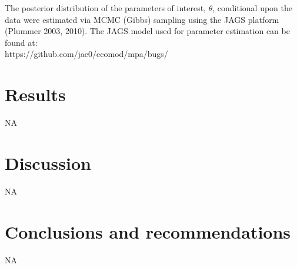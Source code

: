 \documentclass[letterpaper,portrait,11pt]{scrartcl}
\numberwithin{equation}{section}		%
\numberwithin{figure}{section}			%
\numberwithin{table}{section}				%
\begin{document}
The posterior distribution of the parameters of interest, $\theta$, conditional upon the data were estimated via MCMC (Gibbs) sampling using the JAGS platform (Plummer 2003, 2010). The JAGS model used for parameter estimation can be found at: \\

https://github.com/jae0/ecomod/mpa/bugs/




\section{Results}

NA

\section{Discussion}

NA

\section{Conclusions and recommendations}

NA




\clearpage

%
%



\clearpage \newpage
\end{document}
